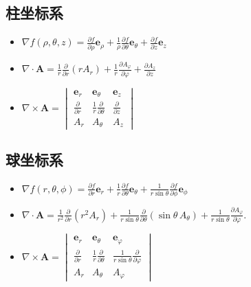 \documentclass{ctexart}
\begin{document}
\subsection{柱坐标系}
\begin{itemize}
\item	$ \nabla f(\rho,\theta,z) = \frac{\partial f}{\partial\rho} \mathbf{e}_{\rho}
                            + \frac1{\rho}\frac{\partial f}{\partial\theta} \mathbf{e}_{\theta}
                            + \frac{\partial f}{\partial z} \mathbf{e}_{z}	$
\item	$ \nabla\cdot\mathbf A = \frac{1}{r} \frac{\partial}{\partial r} (rA_r) 
			+ \frac{1}{r} \frac{\partial A_\varphi}{\partial\varphi} 
			+ \frac{\partial A_z}{\partial z} $
\item	$ \nabla\times\mathbf{A} = 
		\begin{vmatrix} 
			\mathbf{e}_{r} & \mathbf{e}_{\theta} & \mathbf{e}_z \\ 
			\frac{\partial}{\partial r} & \frac{1}{r}\frac{\partial}{\partial \theta} & \frac {\partial}{\partial z} \\ 
			A_r & A_{\theta} & A_z 
		\end{vmatrix} $
\end{itemize}

\subsection{球坐标系}
\begin{itemize}
\item	$ \nabla f(r,\theta,\phi) = \frac{\partial f}{\partial r} \mathbf{e}_{r}
                            + \frac1{r}\frac{\partial f}{\partial\theta} \mathbf{e}_{\theta}
                            + \frac1{r\sin \theta}\frac{\partial f}{\partial \phi} \mathbf{e}_{\phi} $	
\item	$ \nabla\cdot\mathbf A = \frac{1}{r^2} \frac{\partial}{\partial r}(r^2 A_r) 
			+ \frac{1}{r\sin\theta} \frac{\partial}{\partial \theta} (\sin\theta\, A_\theta)
			+ \frac{1}{r\sin\theta} \frac{\partial A_\varphi}{\partial \varphi}.
	$
\item	$ \nabla\times\mathbf{A} = 
		\begin{vmatrix} 
			\mathbf{e}_{r} & \mathbf{e}_{\theta} & \mathbf{e}_{\varphi} \\ 
			\frac{\partial}{\partial r} & \frac{1}{r}\frac{\partial}{\partial \theta} & \frac {1}{r\sin\theta}\frac {\partial}{\partial \varphi} \\ 
			A_r & A_{\theta} & A_{\varphi} 
		\end{vmatrix}
	$
\end{itemize}
\end{document}
